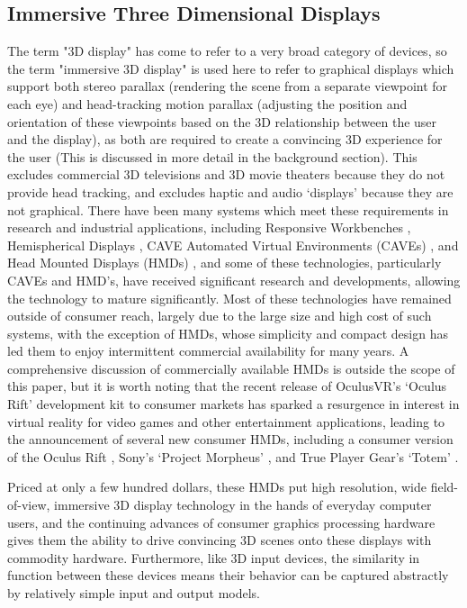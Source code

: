 \subsection{Immersive Three Dimensional Displays}
	
	The term "3D display" has come to refer to a very broad category of devices, so the term "immersive 3D display" is used here to refer to graphical displays which support both stereo parallax (rendering the scene from a separate viewpoint for each eye) and head-tracking motion parallax (adjusting the position and orientation of these viewpoints based on the 3D relationship between the user and the display), as both are required to create a convincing 3D experience for the user (This is discussed in more detail in the background section). This excludes commercial 3D televisions and 3D movie theaters because they do not provide head tracking, and excludes haptic and audio ‘displays’ because they are not graphical. There have been many systems which meet these requirements in research and industrial applications, including Responsive Workbenches \cite{responsive-workbench}, Hemispherical Displays \cite{hemi-display}, CAVE Automated Virtual Environments (CAVEs) \cite{cave}, and Head Mounted Displays (HMDs) \cite{sutherland-hmd}, and some of these technologies, particularly CAVEs and HMD’s, have received significant research and developments, allowing the technology to mature significantly. 
Most of these technologies have remained outside of consumer reach, largely due to the large size and high cost of such systems, with the exception of HMDs, whose simplicity and compact design has led them to enjoy intermittent commercial availability for many years. A comprehensive discussion of commercially available HMDs is outside the scope of this paper, but it is worth noting that the recent release of OculusVR’s ‘Oculus Rift’ development kit to consumer markets has sparked a resurgence in interest in virtual reality for video games and other entertainment applications, leading to the announcement of several new consumer HMDs, including a consumer version of the Oculus Rift \cite{oculus-rift}, Sony’s ‘Project Morpheus’ \cite{project-morpheus}, and True Player Gear’s ‘Totem’ \cite{true-player-gear}. 

Priced at only a few hundred dollars, these HMDs put high resolution, wide field-of-view, immersive 3D display technology in the hands of everyday computer users, and the continuing advances of consumer graphics processing hardware gives them the ability to drive convincing 3D scenes onto these displays with commodity hardware. Furthermore, like 3D input devices, the similarity in function between these devices means their behavior can be captured abstractly by relatively simple input and output models. 
